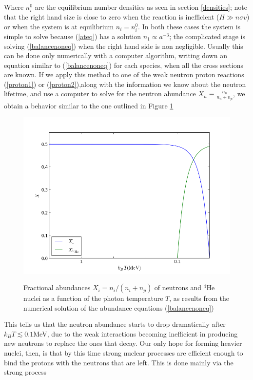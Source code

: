Where $n_i^0$ are the equilibrium number densities as seen in section \ref{densities}; note that the right hand size is close to zero when the reaction is inefficient ($H\gg n\sigma v$) or when the system is at equilibrium $n_i=n_i^0$. In both these cases the system is simple to solve because (\ref{ateq}) has a solution $n_1\propto a^{-3}$; the complicated stage is solving (\ref{balancenoneq}) when the right hand side is non negligible. Usually this can be done only numerically with a computer algorithm, writing down an equation similar to (\ref{balancenoneq}) for each species, when all the cross sections are known. If we apply this method to one of the weak neutron proton reactions (\ref{proton1}) or (\ref{proton2}),along with the information we know about the neutron lifetime, and use a computer to solve for the neutron abundance $X_n\equiv \frac{n_n}{n_n+n_p}$, we obtain a behavior similar to the one outlined in Figure \ref{abun}
\begin{figure}
\begin{center}
\includegraphics[scale=0.7]{Draw/abundances.png}
\label{}
\end{center}
\caption{Fractional abundances $X_i=n_i/(n_i+n_p)$ of neutrons and $^4$He nuclei as a function of the photon temperature $T$, as results from the numerical solution of the abundance equations (\ref{balancenoneq})}
\label{abun}
\end{figure}
This tells us that the neutron abundance starts to drop dramatically after $k_BT\lesssim 0.1$MeV, due to the weak interactions becoming inefficient in producing new neutrons to replace the ones that decay. Our only hope for forming heavier nuclei, then, is that by this time strong nuclear processes are efficient enough to bind the protons with the neutrons that are left. This is done mainly via the strong process
